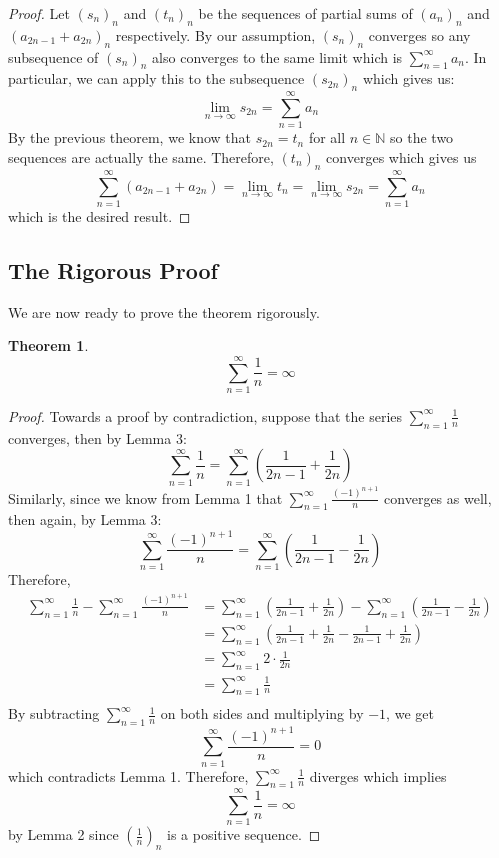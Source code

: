 \documentclass[10pt]{article}
\newcommand{\N}{\mathbb{N}}
\theoremstyle{definition}
\newtheorem*{theorem}{Theorem}
\begin{document}
\begin{proof}
    Let $(s_n)_n$ and $(t_n)_n$ be the sequences of partial sums of $(a_n)_n$ and $(a_{2n-1} + a_{2n})_n$ respectively. By our assumption, $(s_n)_n$ converges so any subsequence of $(s_n)_n$ also converges to the same limit which is $\sum_{n=1}^{\infty}a_n$. In particular, we can apply this to the subsequence $(s_{2n})_n$ which gives us:
    $$\lim_{n \rightarrow \infty}s_{2n} = \sum_{n=1}^{\infty}a_n$$ 
    By the previous theorem, we know that $s_{2n} = t_n$ for all $n \in \N$ so the two sequences are actually the same. Therefore, $(t_n)_n$ converges which gives us
    $$\sum_{n=1}^{\infty}(a_{2n-1} + a_{2n}) = \lim_{n \rightarrow \infty}t_n = \lim_{n \rightarrow \infty}s_{2n} = \sum_{n=1}^{\infty}a_n$$
    which is the desired result.
\end{proof}

\subsection{The Rigorous Proof}

We are now ready to prove the theorem rigorously.

\begin{theorem}
    $$\sum_{n=1}^{\infty}\frac{1}{n} = \infty$$
\end{theorem}

\begin{proof}
    Towards a proof by contradiction, suppose that the series $\sum_{n=1}^{\infty}\frac{1}{n}$ converges, then by Lemma 3:
    $$\sum_{n=1}^{\infty}\frac{1}{n} = \sum_{n=1}^{\infty}\left(\frac{1}{2n-1} + \frac{1}{2n}\right)$$
    Similarly, since we know from Lemma 1 that $\sum_{n=1}^{\infty}\frac{(-1)^{n+1}}{n}$ converges as well, then again, by Lemma 3:
    $$\sum_{n=1}^{\infty}\frac{(-1)^{n+1}}{n} = \sum_{n=1}^{\infty}\left(\frac{1}{2n-1} - \frac{1}{2n}\right)$$
    Therefore,
    \begin{align*}
        \sum_{n=1}^{\infty}\frac{1}{n} - \sum_{n=1}^{\infty}\frac{(-1)^{n+1}}{n} &= \sum_{n=1}^{\infty}\left(\frac{1}{2n-1} + \frac{1}{2n}\right) - \sum_{n=1}^{\infty}\left(\frac{1}{2n-1} - \frac{1}{2n}\right) \\
        &= \sum_{n=1}^{\infty}\left(\frac{1}{2n-1} + \frac{1}{2n} - \frac{1}{2n-1} + \frac{1}{2n}\right) \\
        &= \sum_{n=1}^{\infty}2\cdot \frac{1}{2n} \\
        &= \sum_{n=1}^{\infty}\frac{1}{n} \\
    \end{align*}
    By subtracting $\sum_{n=1}^{\infty}\frac{1}{n}$ on both sides and multiplying by $-1$, we get
    $$ \sum_{n=1}^{\infty}\frac{(-1)^{n+1}}{n} = 0$$
    which contradicts Lemma 1. Therefore, $\sum_{n=1}^{\infty}\frac{1}{n}$ diverges which implies 
    $$\sum_{n=1}^{\infty}\frac{1}{n} = \infty$$
    by Lemma 2 since $(\frac{1}{n})_n$ is a positive sequence.
\end{proof}
\end{document}
